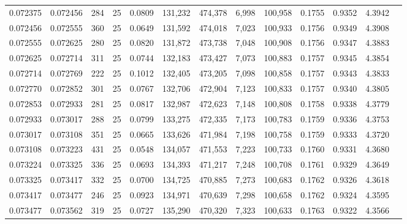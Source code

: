 \begin{tabular}{rrrrrrrrrrrrr}
0.072375 & 0.072456 &   284 &  25 &                                     0.0809 & 131,232 & 474,378 &   6,998 & 100,958 & 0.1755 & 0.9352 & 4.3942 \\
0.072456 & 0.072555 &   360 &  25 &                                     0.0649 & 131,592 & 474,018 &   7,023 & 100,933 & 0.1756 & 0.9349 & 4.3908 \\
0.072555 & 0.072625 &   280 &  25 &                                     0.0820 & 131,872 & 473,738 &   7,048 & 100,908 & 0.1756 & 0.9347 & 4.3883 \\
0.072625 & 0.072714 &   311 &  25 &                                     0.0744 & 132,183 & 473,427 &   7,073 & 100,883 & 0.1757 & 0.9345 & 4.3854 \\
0.072714 & 0.072769 &   222 &  25 &                                     0.1012 & 132,405 & 473,205 &   7,098 & 100,858 & 0.1757 & 0.9343 & 4.3833 \\
0.072770 & 0.072852 &   301 &  25 &                                     0.0767 & 132,706 & 472,904 &   7,123 & 100,833 & 0.1757 & 0.9340 & 4.3805 \\
0.072853 & 0.072933 &   281 &  25 &                                     0.0817 & 132,987 & 472,623 &   7,148 & 100,808 & 0.1758 & 0.9338 & 4.3779 \\
0.072933 & 0.073017 &   288 &  25 &                                     0.0799 & 133,275 & 472,335 &   7,173 & 100,783 & 0.1759 & 0.9336 & 4.3753 \\
0.073017 & 0.073108 &   351 &  25 &                                     0.0665 & 133,626 & 471,984 &   7,198 & 100,758 & 0.1759 & 0.9333 & 4.3720 \\
0.073108 & 0.073223 &   431 &  25 &                                     0.0548 & 134,057 & 471,553 &   7,223 & 100,733 & 0.1760 & 0.9331 & 4.3680 \\
0.073224 & 0.073325 &   336 &  25 &                                     0.0693 & 134,393 & 471,217 &   7,248 & 100,708 & 0.1761 & 0.9329 & 4.3649 \\
0.073325 & 0.073417 &   332 &  25 &                                     0.0700 & 134,725 & 470,885 &   7,273 & 100,683 & 0.1762 & 0.9326 & 4.3618 \\
0.073417 & 0.073477 &   246 &  25 &                                     0.0923 & 134,971 & 470,639 &   7,298 & 100,658 & 0.1762 & 0.9324 & 4.3595 \\
0.073477 & 0.073562 &   319 &  25 &                                     0.0727 & 135,290 & 470,320 &   7,323 & 100,633 & 0.1763 & 0.9322 & 4.3566 \\

\end{tabular}
